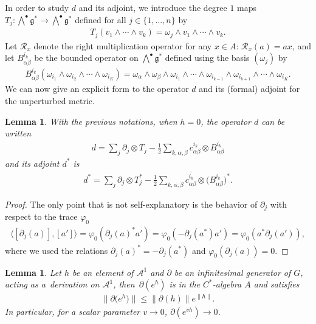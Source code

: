 \documentclass[11pt]{article}
\newtheorem{Lemma}[Theorem]{Lemma}
\newcommand{\Aa}{\mathcal{A}}
\newcommand{\LieG}{\mathfrak{g}}
\newcommand{\RightMult}{\mathcal{R}}
\numberwithin{equation}{section}
\begin{document}
In order to study $d$ and its adjoint, we introduce the degree $1$ maps $T_j \colon \bigwedge^\bullet \LieG^* \to \bigwedge^\bullet \LieG^*$ def\/ined for all $j \in \{1, \ldots, n\}$ by
\begin{gather*}
T_j( v_1 \wedge \cdots \wedge v_k) = \omega_j \wedge v_1 \wedge \cdots \wedge v_k.
\end{gather*}
Let $\RightMult_{x}$ denote the right multiplication operator for any $x \in A$: $\RightMult_{x}(a) = a x$, and let $B^{i_k}_{\alpha \beta}$ be the bounded operator on $\bigwedge^\bullet \LieG^*$ def\/ined using the basis $(\omega_j)$ by
\begin{gather*}
B^{i_k}_{\alpha \beta}( \omega_{i_1} \wedge \omega_{i_2} \wedge \cdots \wedge \omega_{i_K}) = \omega_\alpha \wedge \omega_\beta \wedge \omega_{i_1} \wedge \cdots \wedge \omega_{i_{k-1}} \wedge \omega_{i_{k+1}} \wedge \cdots \wedge \omega_{i_K}.
\end{gather*}
We can now give an explicit form to the operator $d$ and its (formal) adjoint for the unperturbed metric.
\begin{Lemma}
\label{Lem:Formed}
With the previous notations, when $h = 0$, the operator $d$ can be written
\begin{gather*}
d = \sum_j \partial_j \otimes T_j - \frac{1}{2} \sum_{k,\alpha,\beta} c^{i_k}_{\alpha \beta} \otimes B^{i_k}_{\alpha \beta}
\end{gather*}
and its adjoint $d^*$ is
\begin{gather*}
d^* = \sum_j \partial_j \otimes T_j^* - \frac{1}{2} \sum_{k,\alpha, \beta} \overline{c^{i_k}_{\alpha \beta}} \otimes \big(B^{i_k}_{\alpha \beta}\big)^*.
\end{gather*}
\end{Lemma}

\begin{proof}
The only point that is not self-explanatory is the behavior of $\partial_j$ with respect to the trace $\varphi_0$
\begin{gather*}
\langle [\partial_j(a)], [a'] \rangle = \varphi_0( \partial_j(a)^* a') = \varphi_0( -\partial_j(a^*) a') = \varphi_0(a^* \partial_j(a')),
\end{gather*}
where we used the relations $\partial_j(a)^* = - \partial_j(a^*)$ and $\varphi_0( \partial_j(a)) = 0$.
\end{proof}

\begin{Lemma}
\label{Lem:CVExp}
Let $h$ be an element of $\Aa^1$ and $\partial $ be an infinitesimal generator of $G$, acting as a~derivation on $\Aa^1$, then~$\partial ( e^{h} )$ is in the $C^*$-algebra $A$ and satisfies
\begin{gather*}
\big\| \partial \big( e^{h} \big) \big\| \leqslant \| \partial (h) \| e^{\| h\| }.
\end{gather*}
In particular, for a scalar parameter $v \to 0$, $\partial (e^{v h}) \to 0$.
\end{Lemma}
\end{document}
